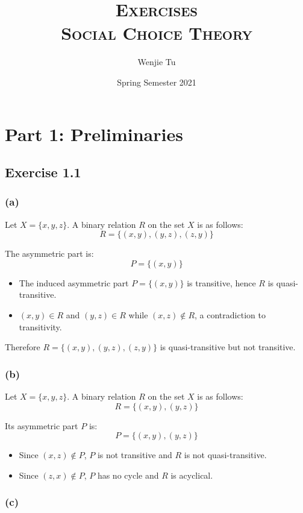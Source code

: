 \documentclass[a4paper]{article}
\title{%
    \textsc{Exercises} \\
    \vspace{1mm}
    \large \textsc{Social Choice Theory}
}
\author{Wenjie Tu}
\date{Spring Semester 2021}
\begin{document}
\maketitle

\section*{Part 1: Preliminaries}

\subsection*{Exercise 1.1}

\subsubsection*{(a)}

Let $X=\{x, y, z\}$. A binary relation $R$ on the set $X$ is as follows:
\[R=\{(x,y), (y,z), (z,y) \} \]

The asymmetric part is:
\[P=\{(x,y)\} \]

\begin{itemize}
    \item The induced asymmetric part $P=\{(x,y)\}$ is transitive, hence $R$ is quasi-transitive.
    \item $(x,y)\in R$ and $(y,z)\in R$ while $(x,z)\notin R$, a contradiction to transitivity.
\end{itemize}

Therefore $R=\{(x,y), (y,z), (z,y) \}$ is quasi-transitive but not transitive.

\subsubsection*{(b)}

Let $X=\{x, y, z\}$. A binary relation $R$ on the set $X$ is as follows:
\[R=\{(x,y), (y,z) \} \]

Its asymmetric part $P$ is:
\[P=\{(x,y), (y,z) \} \]

\begin{itemize}
    \item Since $(x,z)\notin P$, $P$ is not transitive and $R$ is not quasi-transitive.
    \item Since $(z,x)\notin P$, $P$ has no cycle and $R$ is acyclical.
\end{itemize}


\subsubsection*{(c)}
\end{document}
